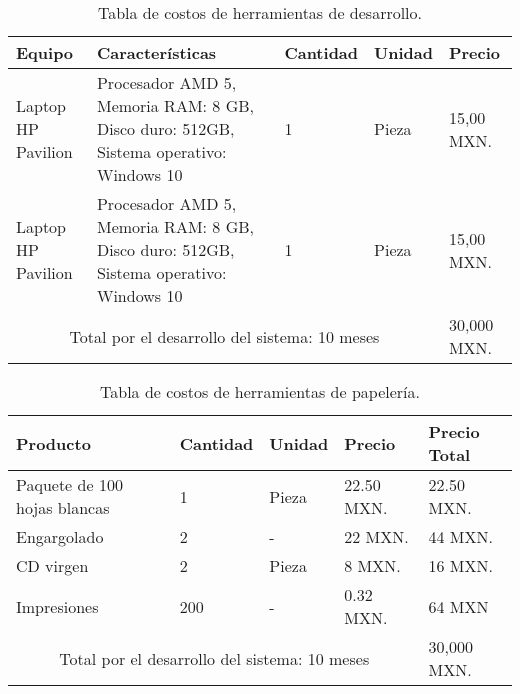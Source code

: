 	\begin{table}[htbp]
		\begin{center}
			\begin{tabular}{|p{20mm}|p{30mm}|p{15mm}|p{15mm}|p{15mm}|}
				\hline
				\textbf{Equipo} & \textbf{Características} & \textbf{Cantidad} & \textbf{Unidad} & \textbf{Precio}\\ \hline 
				Laptop HP Pavilion & Procesador AMD 5, Memoria RAM: 8 GB, Disco duro: 512GB, Sistema operativo: Windows 10  & 1 & Pieza & 15,00 MXN. \\ \hline
				
				Laptop HP Pavilion & Procesador AMD 5, Memoria RAM: 8 GB, Disco duro: 512GB, Sistema operativo: Windows 10  & 1 & Pieza & 15,00 MXN. \\ \hline
				
				\multicolumn{4}{|c|}{Total por el desarrollo del sistema: 10 meses} & 30,000 MXN.\\ \hline
			\end{tabular}
			\caption{Tabla de costos de herramientas de desarrollo.}
			\label{tablcostoherramientas}
		\end{center}
	\end{table}
	
	\begin{table}[htbp]
		\begin{center}
			\begin{tabular}{|p{20mm}|p{30mm}|p{15mm}|p{15mm}|p{15mm}|}
				\hline
				\textbf{Producto} & \textbf{Cantidad} & \textbf{Unidad} & \textbf{Precio}  & \textbf{Precio Total}\\ \hline 
				Paquete de 100 hojas blancas & 1  & Pieza & 22.50 MXN. & 22.50 MXN. \\ \hline
				
				Engargolado & 2 & - & 22 MXN. & 44 MXN. \\ \hline
				
				CD virgen & 2 & Pieza & 8 MXN. & 16 MXN. \\ \hline
				
				Impresiones & 200 & - & 0.32 MXN. & 64 MXN \\ \hline
				
				\multicolumn{4}{|c|}{Total por el desarrollo del sistema: 10 meses} & 30,000 MXN.\\ \hline
			\end{tabular}
			\caption{Tabla de costos de herramientas de papelería.}
			\label{tablacostospapeleria}
		\end{center}
	\end{table}
\pagebreak
	
